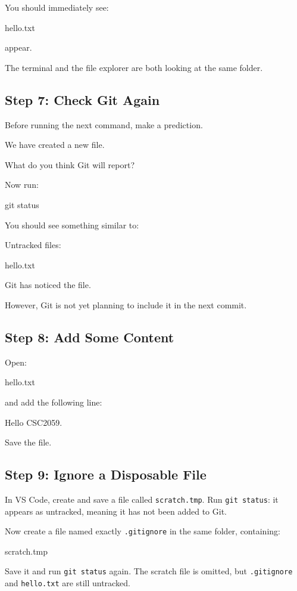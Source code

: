 \documentclass{csc2059practical}
\begin{document}
You should immediately see:

\begin{terminalplain}
hello.txt
\end{terminalplain}
appear.

The terminal and the file explorer are both looking at the same folder.

\subsection{Step 7: Check Git Again}
Before running the next command, make a prediction.

We have created a new file.

What do you think Git will report?

Now run:

\begin{terminalplain}
git status
\end{terminalplain}
You should see something similar to:

\begin{terminalplain}
Untracked files:

\hspace{1cm}\textcolor{GitRed}{hello.txt}
\end{terminalplain}
Git has noticed the file.

However, Git is not yet planning to include it in the next commit.

\subsection{Step 8: Add Some Content}
Open:

\begin{terminalplain}
hello.txt
\end{terminalplain}
and add the following line:

\begin{terminalplain}
Hello CSC2059.
\end{terminalplain}
Save the file.

\subsection{Step 9: Ignore a Disposable File}
In VS Code, create and save a file called \texttt{scratch.tmp}. Run \texttt{git status}: it appears as untracked, meaning it has not been added to Git.

Now create a file named exactly \texttt{.gitignore} in the same folder, containing:
\begin{terminalplain}
scratch.tmp
\end{terminalplain}
Save it and run \texttt{git status} again. The scratch file is omitted, but \texttt{.gitignore} and \texttt{hello.txt} are still untracked.
\end{document}
